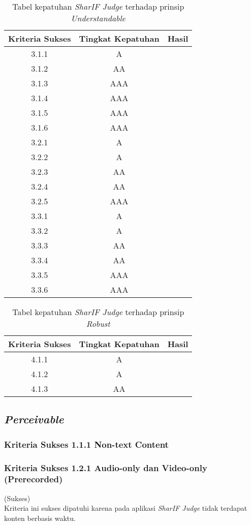 \begin{table}[H]
	\centering
	\caption{Tabel kepatuhan \textit{SharIF Judge} terhadap prinsip \textit{Understandable}}
	\label{tab:kepatuhan_sharif_judge_understandable}
	\begin{tabular}{|c|c|c|}
		\hline
		Kriteria Sukses & Tingkat Kepatuhan & Hasil \\
		\hline
		3.1.1 & A & \\
		3.1.2 & AA & \\
		3.1.3 & AAA & \\
		3.1.4 & AAA & \\
		3.1.5 & AAA & \\
		3.1.6 & AAA & \\
		3.2.1 & A & \\
		3.2.2 & A & \\
		3.2.3 & AA & \\
		3.2.4 & AA & \\
		3.2.5 & AAA & \\
		3.3.1 & A & \\
		3.3.2 & A & \\
		3.3.3 & AA & \\
		3.3.4 & AA & \\
		3.3.5 & AAA & \\
		3.3.6 & AAA & \\
		\hline
	\end{tabular}
\end{table}

\begin{table}[H]
	\centering
	\caption{Tabel kepatuhan \textit{SharIF Judge} terhadap prinsip \textit{Robust}}
	\label{tab:kepatuhan_sharif_judge_robust}
	\begin{tabular}{|c|c|c|}
		\hline
		Kriteria Sukses & Tingkat Kepatuhan & Hasil \\
		\hline
		4.1.1 & A & \\
		4.1.2 & A & \\
		4.1.3 & AA & \\
		\hline
	\end{tabular}
\end{table}

\subsection{\textit{Perceivable}}
\label{subsec:perceivable}

\subsubsection{Kriteria Sukses 1.1.1 Non-text Content}
\label{subsubsec:kriteria_1.1.1}

\subsubsection{Kriteria Sukses 1.2.1 Audio-only dan Video-only (Prerecorded)}
\label{subsubsec:kriteria_1.2.1}
(Sukses) \\

Kriteria ini sukses dipatuhi karena pada aplikasi \textit{SharIF Judge} tidak terdapat konten berbasis waktu.
